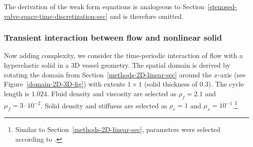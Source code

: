 \documentclass[3p]{elsarticle}
\begin{document}
The derivation of the weak form equations
is analogeous to Section~\ref{stenosed-valve-space-time-discretization-sec}
and is therefore omitted.
\subsubsection{Transient interaction between flow and nonlinear solid}
\label{methods-3D-nonlinear-sec}
Now adding complexity, we consider the time-periodic interaction
of flow with a hyperelastic solid in a 3D vessel geometry.
The spatial domain is derived by rotating the domain from Section~\ref{methods-2D-linear-sec}
around the $x$-axis (see Figure~\ref{domain-2D-3D-fig})
with extents $1 \times 1$ (solid thickness of $0.3$). The cycle length is $1.024$.
Fluid density and viscosity are selected as $\rho_f = 2.1$ and $\mu_f = 3 \cdot 10^{-2}$.
Solid density and stiffness are selected as $\rho_s = 1$ and $\mu_s = 10^{-1}$.\footnote{Similar
to Section~\ref{methods-2D-linear-sec}, parameters were selected
according to \cite[Section 5.2]{HessenthalerBalmusRoehrleNordsletten2020}.}
\end{document}
